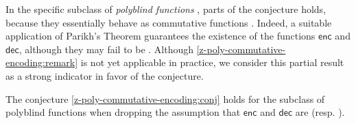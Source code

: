 In the specific subclass of \emph{polyblind functions}
\cite{LENP21,DOUE22}, parts of the conjecture holds,
because they essentially behave as commutative functions \cite[Theorem
6.12]{DOUE23}. Indeed, a suitable application of Parikh's Theorem
\cite{PARI66} guarantees the existence of the functions $\mathsf{enc}$
and $\mathsf{dec}$, although they may fail to be  .
Although \cref{z-poly-commutative-encoding:remark} is not yet applicable in
practice, we consider this partial result as a strong indicator in favor of the
conjecture.

\begin{remark}
    \label{z-poly-commutative-encoding:remark}
    The conjecture \cref{z-poly-commutative-encoding:conj} holds for the
    subclass of polyblind functions when dropping the assumption that
    $\mathsf{enc}$ and $\mathsf{dec}$ are 
    (resp. ).
\end{remark}
